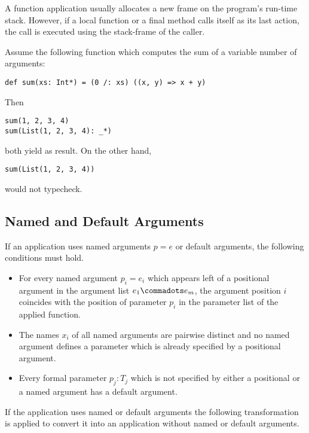 A function application usually allocates a new frame on the program's
run-time stack. However, if a local function or a final method calls
itself as its last action, the call is executed using the stack-frame
of the caller.

\example Assume the following function which computes the sum of a
variable number of arguments:
\begin{lstlisting}
def sum(xs: Int*) = (0 /: xs) ((x, y) => x + y)
\end{lstlisting}
Then
\begin{lstlisting}
sum(1, 2, 3, 4)
sum(List(1, 2, 3, 4): _*)
\end{lstlisting}
both yield  as result. On the other hand, 
\begin{lstlisting}
sum(List(1, 2, 3, 4))
\end{lstlisting}
would not typecheck.

\subsection{Named and Default Arguments}
\label{sec:named-default}

If an application uses named arguments $p = e$ or default arguments,
the following conditions must hold.
\begin{itemize}
\item For every named argument $p_i = e_i$ which appears left of a positional argument
in the argument list $e_1 \commadots e_m$, the argument position $i$ coincides with
the position of parameter $p_i$ in the parameter list of the applied function.
\item The names $x_i$ of all named arguments are pairwise distinct and no named
  argument defines a parameter which is already specified by a
  positional argument.
\item Every formal parameter $p_j:T_j$ which is not specified by either a positional
  or a named argument has a default argument.
\end{itemize}

If the application uses named or default
arguments the following transformation is applied to convert it into
an application without named or default arguments. 

